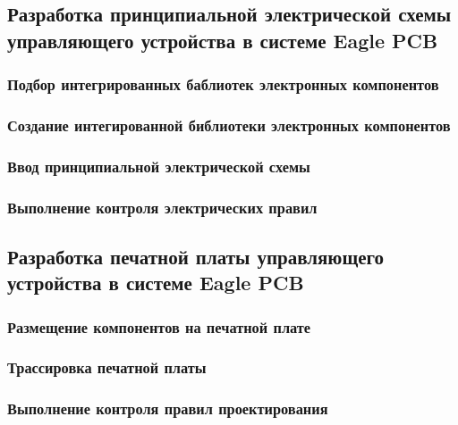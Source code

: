 \subsection{Разработка принципиальной электрической схемы управляющего устройства в системе Eagle PCB}
\subsubsection{Подбор интегрированных баблиотек электронных компонентов}
\subsubsection{Создание интегированной библиотеки электронных компонентов}
\subsubsection{Ввод принципиальной электрической схемы}
\subsubsection{Выполнение контроля электрических правил}

\subsection{Разработка печатной платы управляющего устройства в системе Eagle PCB}
\subsubsection{Размещение компонентов на печатной плате}
\subsubsection{Трассировка печатной платы}
\subsubsection{Выполнение контроля правил проектирования}
